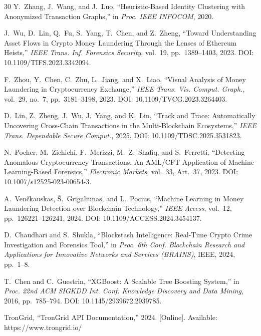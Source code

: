 \documentclass[journal]{IEEEtran}
\begin{document}
\begin{thebibliography}{30}
    Y.~Zhang, J.~Wang, and J.~Luo, ``Heuristic-Based Identity Clustering with Anonymized Transaction Graphs,'' in \textit{Proc. IEEE INFOCOM}, 2020.
    
    J.~Wu, D.~Lin, Q.~Fu, S.~Yang, T.~Chen, and Z.~Zheng, ``Toward Understanding Asset Flows in Crypto Money Laundering Through the Lenses of Ethereum Heists,'' \textit{IEEE Trans. Inf. Forensics Security}, vol.~19, pp.~1389--1403, 2023. DOI: 10.1109/TIFS.2023.3342094.
    
    F.~Zhou, Y.~Chen, C.~Zhu, L.~Jiang, and X.~Liao, ``Visual Analysis of Money Laundering in Cryptocurrency Exchange,'' \textit{IEEE Trans. Vis. Comput. Graph.}, vol.~29, no.~7, pp.~3181--3198, 2023. DOI: 10.1109/TVCG.2023.3264403.
    
    D.~Lin, Z.~Zheng, J.~Wu, J.~Yang, and K.~Lin, ``Track and Trace: Automatically Uncovering Cross-Chain Transactions in the Multi-Blockchain Ecosystems,'' \textit{IEEE Trans. Dependable Secure Comput.}, 2025. DOI: 10.1109/TDSC.2025.3531823.
    
    N.~Pocher, M.~Zichichi, F.~Merizzi, M.~Z.~Shafiq, and S.~Ferretti, ``Detecting Anomalous Cryptocurrency Transactions: An AML/CFT Application of Machine Learning-Based Forensics,'' \textit{Electronic Markets}, vol.~33, Art.~37, 2023. DOI: 10.1007/s12525-023-00654-3.
    
    A.~Ven\v{c}kauskas, \v{S}.~Grigali\={u}nas, and L.~Pocius, ``Machine Learning in Money Laundering Detection over Blockchain Technology,'' \textit{IEEE Access}, vol.~12, pp.~126221--126241, 2024. DOI: 10.1109/ACCESS.2024.3454137.
    
    D.~Chaudhari and S.~Shukla, ``Blockstash Intelligence: Real-Time Crypto Crime Investigation and Forensics Tool,'' in \textit{Proc. 6th Conf. Blockchain Research and Applications for Innovative Networks and Services (BRAINS)}, IEEE, 2024, pp.~1--8.
    
    T.~Chen and C.~Guestrin, ``XGBoost: A Scalable Tree Boosting System,'' in \textit{Proc. 22nd ACM SIGKDD Int. Conf. Knowledge Discovery and Data Mining}, 2016, pp.~785--794. DOI: 10.1145/2939672.2939785.
    
    TronGrid, ``TronGrid API Documentation,'' 2024. [Online]. Available: https://www.trongrid.io/
    

\end{thebibliography}
\end{document}

